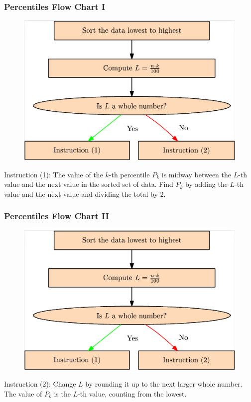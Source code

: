\documentclass[xcolor=dvipsnames]{beamer}
\begin{document}
\begin{frame}
  \frametitle{Percentiles Flow Chart I}
\begin{figure}[h]
\includegraphics[scale=.15]{./percentile.png}
\end{figure}
Instruction (1): The value of the $k$-th percentile $P_{k}$ is midway
between the $L$-th value and the next value in the sorted set of data.
Find $P_{k}$ by adding the $L$-th value and the next value and
dividing the total by $2$.
\end{frame}

\begin{frame}
  \frametitle{Percentiles Flow Chart II}
\begin{figure}[h]
\includegraphics[scale=.15]{./percentile.png}
\end{figure}
Instruction (2): Change $L$ by rounding it up to the next larger
whole number. The value of $P_{k}$ is the $L$-th value, counting
from the lowest.
\end{frame}
\end{document}
